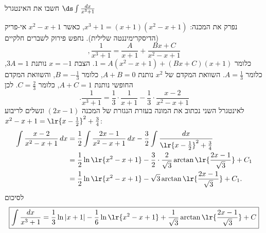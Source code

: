 חשבו את האינטגרל
$\ds \int \frac{dx}{x^{3}+1}$
\begin{solbox}
\unverified
נפרק את המכנה:
$x^3+1=(x+1)(x^2-x+1)$,
כאשר
$x^2-x+1$
אי-פריק (הדיסקרימיננטה שלילית). נחפש פירוק לשברים חלקיים
$$,\frac{1}{x^3+1}=\frac{A}{x+1}+\frac{Bx+C}{x^2-x+1}$$
כלומר
$1=A(x^2-x+1)+(Bx+C)(x+1)$.
הצבת
$x=-1$
נותנת
$3A=1$,
כלומר
$A=\frac13$.
השוואת המקדם של
$x^2$
נותנת
$A+B=0$,
כלומר
$B=-\frac13$,
והשוואת המקדם החופשי נותנת
$A+C=1$,
כלומר
$C=\frac23$.
לכן
$$.\frac{1}{x^3+1}=\frac{1}{3}\cdot\frac{1}{x+1}-\frac13\cdot\frac{x-2}{x^2-x+1}$$
לאינטגרל השני נכתוב את המונה בעזרת הנגזרת של המכנה
$(2x-1)$
ונשלים לריבוע
$x^2-x+1=\lr{x-\frac12}^2+\frac34$:
\begin{align*}
\int\frac{x-2}{x^2-x+1}\,dx
&=\frac12\int\frac{2x-1}{x^2-x+1}\,dx-\frac32\int\frac{dx}{\lr{x-\frac12}^2+\frac34}\\
&=\frac12\ln\lr{x^2-x+1}-\frac32\cdot\frac{2}{\sqrt3}\arctan\lr{\frac{2x-1}{\sqrt3}}+C_1\\
&=\frac12\ln\lr{x^2-x+1}-\sqrt3\arctan\lr{\frac{2x-1}{\sqrt3}}+C_1.
\end{align*}
לסיכום
\begin{align*}
\boxed{\int\frac{dx}{x^3+1}=\frac13\ln|x+1|-\frac16\ln\lr{x^2-x+1}+\frac{1}{\sqrt3}\arctan\lr{\frac{2x-1}{\sqrt3}}+C}
\end{align*}
\end{solbox}
